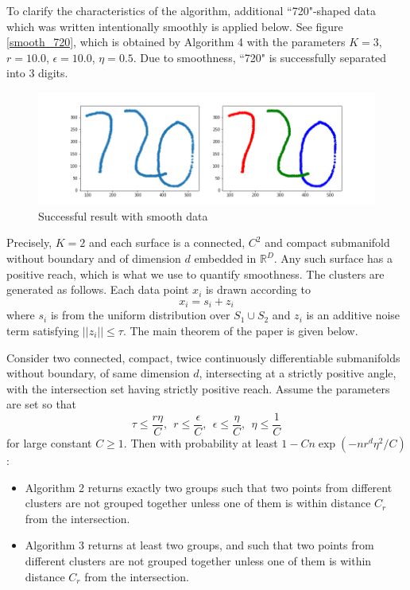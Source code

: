 \documentclass[twoside,11pt]{article}
\begin{document}
To clarify the characteristics of the algorithm, additional ``720"-shaped data which was written intentionally smoothly is applied below.  See figure \autoref{smooth_720}, which is obtained by Algorithm 4 with the parameters $K = 3$, $r = 10.0$, $\epsilon = 10.0$, $\eta = 0.5$.
Due to smoothness, ``720" is successfully separated into 3 digits.

\begin{figure}[htbp]
\centering
\vspace{-1em}
\includegraphics[width=0.9  \textwidth]{smooth_720_1.png}
\vspace{-1em}
\caption{Successful result with smooth data}
\label{smooth_720}
\end{figure}

Precisely, $K=2$ and each surface is a connected, $C^2$ and compact submanifold without boundary and of dimension $d$ embedded in $\mathbb R^D$.
Any such surface has a positive reach, which is what we use to quantify smoothness.
The clusters are generated as follows.
Each data point $x_i$ is drawn according to
$$ x_i = s_i + z_i $$
where $s_i$ is from the uniform distribution over
$S_1\cup S_2$ and $z_i$
is an additive noise term satisfying $||z_i||\le \tau$.
The main theorem of the paper is given below.
\begin{theorem}
Consider two connected, compact, twice continuously differentiable submanifolds
without boundary, of same dimension \(d\), intersecting at a strictly positive angle, with the intersection set having strictly positive reach.
Assume the parameters are set so that
$$
\tau\le \frac{r\eta}{C},\ \ r\le\frac{\epsilon}{C},\ \ \epsilon\le\frac{\eta}{C},\ \ \eta\le\frac{1}{C}
$$
for large constant $C\ge 1$.
Then with probability at least $1-Cn\exp(- nr^d\eta^2/C)$:
\begin{itemize}
\item Algorithm 2 returns exactly two groups such that two points from different clusters are not grouped together unless one of them is within distance \(C_r\) from the intersection.
\item Algorithm 3 returns at least two groups, and such that two points from different clusters are not grouped together unless one of them is within distance \(C_r\) from the intersection.
\end{itemize}
\end{theorem}
\end{document}
